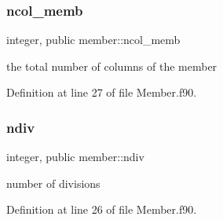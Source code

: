 \subsubsection{\texorpdfstring{ncol\+\_\+memb}{ncol\_memb}}
{\footnotesize\ttfamily integer, public member\+::ncol\+\_\+memb}



the total number of columns of the member 



Definition at line 27 of file Member.\+f90.

\mbox{\label{namespacemember_a3e6a3b0896edb5c30c113dc22ab7181a}} 
\subsubsection{\texorpdfstring{ndiv}{ndiv}}
{\footnotesize\ttfamily integer, public member\+::ndiv}



number of divisions 



Definition at line 26 of file Member.\+f90.

